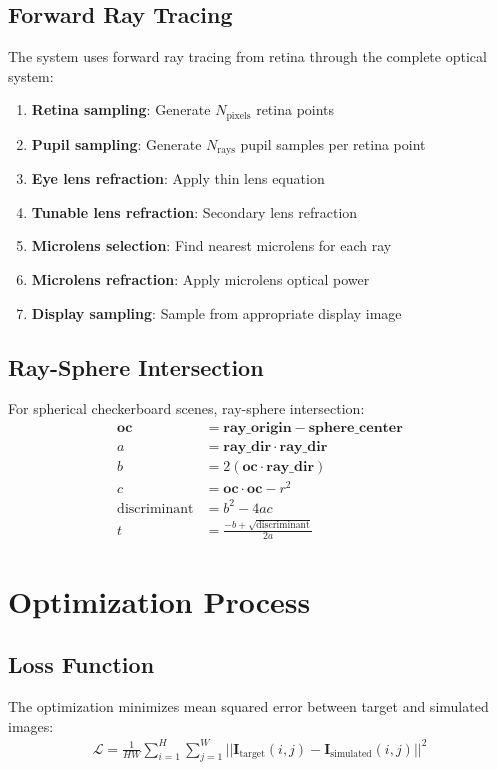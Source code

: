 \documentclass[11pt]{article}
\begin{document}
\subsection{Forward Ray Tracing}
The system uses forward ray tracing from retina through the complete optical system:

\begin{enumerate}
    \item \textbf{Retina sampling}: Generate $N_{\text{pixels}}$ retina points
    \item \textbf{Pupil sampling}: Generate $N_{\text{rays}}$ pupil samples per retina point
    \item \textbf{Eye lens refraction}: Apply thin lens equation
    \item \textbf{Tunable lens refraction}: Secondary lens refraction
    \item \textbf{Microlens selection}: Find nearest microlens for each ray
    \item \textbf{Microlens refraction}: Apply microlens optical power
    \item \textbf{Display sampling}: Sample from appropriate display image
\end{enumerate}

\subsection{Ray-Sphere Intersection}
For spherical checkerboard scenes, ray-sphere intersection:
\begin{align}
\mathbf{oc} &= \mathbf{ray\_origin} - \mathbf{sphere\_center} \\
a &= \mathbf{ray\_dir} \cdot \mathbf{ray\_dir} \\
b &= 2(\mathbf{oc} \cdot \mathbf{ray\_dir}) \\
c &= \mathbf{oc} \cdot \mathbf{oc} - r^2 \\
\text{discriminant} &= b^2 - 4ac \\
t &= \frac{-b + \sqrt{\text{discriminant}}}{2a}
\end{align}

\section{Optimization Process}

\subsection{Loss Function}
The optimization minimizes mean squared error between target and simulated images:
\begin{align}
\mathcal{L} = \frac{1}{HW} \sum_{i=1}^{H} \sum_{j=1}^{W} ||\mathbf{I}_{\text{target}}(i,j) - \mathbf{I}_{\text{simulated}}(i,j)||^2
\end{align}
\end{document}
